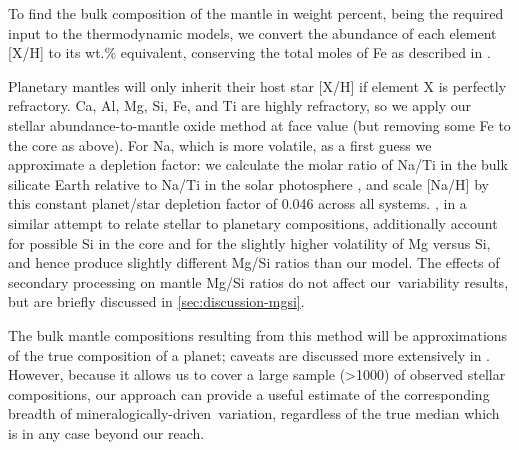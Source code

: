 
To find the bulk composition of the mantle in weight percent, being the required input to the thermodynamic models, we convert the abundance of each element [X/H] to its wt.\% equivalent, conserving the total moles of Fe as described in \citet[n.b. here we interpret their FeO as FeO*]{guimond_mantle_2023}.

Planetary mantles will only inherit their host star [X/H] if element X is perfectly refractory. Ca, Al, Mg, Si, Fe, and Ti are highly refractory, so we apply our stellar abundance-to-mantle oxide method at face value (but removing some Fe to the core as above). For Na, which is more volatile, as a first guess we approximate a depletion factor: we calculate the molar ratio of Na/Ti in the bulk silicate Earth \citep{workman_major_2005} relative to Na/Ti in the solar photosphere \citep{lodders_abundances_2009}, and scale [Na/H] by this constant planet/star depletion factor of 0.046 across all systems. \citet{spaargaren_plausible_2022}, in a similar attempt to relate stellar to planetary compositions, additionally account for possible Si in the core and for the slightly higher volatility of Mg versus Si, and hence produce slightly different Mg/Si ratios than our model. The effects of secondary processing on mantle Mg/Si ratios do not affect our \fo\,variability results, but are briefly discussed in \ref{sec:discussion-mgsi}.%

The bulk mantle compositions resulting from this method will be approximations of the true composition of a planet; caveats are discussed more extensively in \citet{guimond_mantle_2023}. However, because it allows us to cover a large sample (\textgreater 1000) of observed stellar compositions, our approach can provide a useful estimate of the corresponding breadth of mineralogically-driven \fo\,variation, regardless of the true median which is in any case beyond our reach. %






